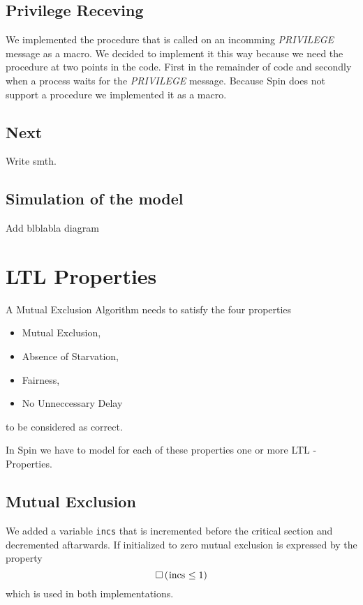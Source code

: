 \documentclass{llncs}
\begin{document}
\subsection{Privilege Receving}

We implemented the procedure that is called on an incomming \emph{PRIVILEGE} message as a macro.
We decided to implement it this way because we need the procedure at two points in the code.
First in the remainder of code and secondly when a process waits for the \emph{PRIVILEGE} message.
Because Spin does not support a procedure we implemented it as a macro.

\subsection{Next}

Write smth.

\subsection{Simulation of the model\label{ssec:run}}

Add blblabla diagram

\section{LTL Properties}

A Mutual Exclusion Algorithm needs to satisfy the four properties
\begin{itemize}
    \item Mutual Exclusion,
    \item Absence of Starvation,
    \item Fairness,
    \item No Unneccessary Delay
\end{itemize}
to be considered as correct.

In Spin we have to model for each of these properties one or more
LTL - Properties.

\subsection{Mutual Exclusion}

We added a variable \lstinline|incs| that is incremented before the critical section
and decremented aftarwards. If initialized to zero mutual exclusion is expressed by the
property
\begin{equation}
    \square \left( \text{\lstinline|incs|} \leq 1 \right)
\end{equation}
which is used in both implementations.
\end{document}
